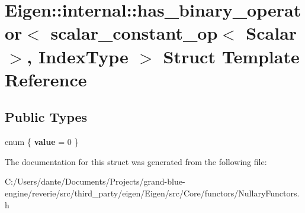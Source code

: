 \hypertarget{struct_eigen_1_1internal_1_1has__binary__operator_3_01scalar__constant__op_3_01_scalar_01_4_00_01_index_type_01_4}{}\section{Eigen\+::internal\+::has\+\_\+binary\+\_\+operator$<$ scalar\+\_\+constant\+\_\+op$<$ Scalar $>$, Index\+Type $>$ Struct Template Reference}
\label{struct_eigen_1_1internal_1_1has__binary__operator_3_01scalar__constant__op_3_01_scalar_01_4_00_01_index_type_01_4}
\subsection*{Public Types}
\begin{DoxyCompactItemize}
\item 
\mbox{\label{struct_eigen_1_1internal_1_1has__binary__operator_3_01scalar__constant__op_3_01_scalar_01_4_00_01_index_type_01_4_a8c0f00e472ef3a467cd5785b9f61d0a0}} 
enum \{ {\bfseries value} = 0
 \}
\end{DoxyCompactItemize}


The documentation for this struct was generated from the following file\+:\begin{DoxyCompactItemize}
\item 
C\+:/\+Users/dante/\+Documents/\+Projects/grand-\/blue-\/engine/reverie/src/third\+\_\+party/eigen/\+Eigen/src/\+Core/functors/Nullary\+Functors.\+h\end{DoxyCompactItemize}
